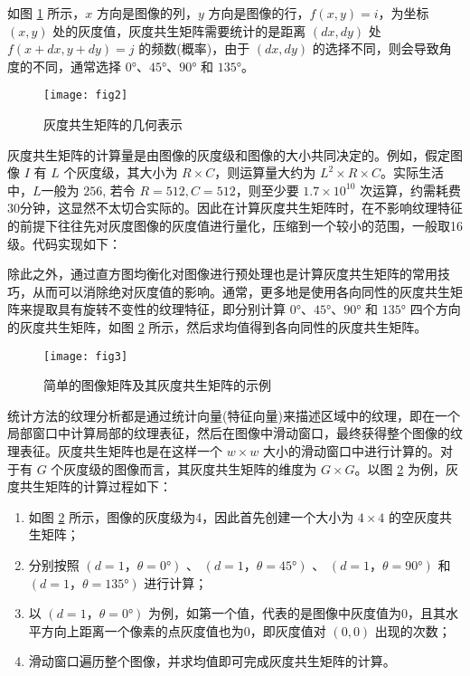 如图 \ref{fig:glcm_figure} 所示，$x$ 方向是图像的列，$y$ 方向是图像的行，$f(x, y) = i$，为坐标 $(x, y)$ 处的灰度值，灰度共生矩阵需要统计的是距离 $(dx, dy)$ 处 $f(x + dx, y + dy) = j$ 的频数(概率)，由于 $(dx, dy)$ 的选择不同，则会导致角度的不同，通常选择 $0°$、$45°$、$90°$ 和 $135°$。

\begin{figure}[!htbp]
	\centering
	\texttt{[image: fig2]}
	\caption{灰度共生矩阵的几何表示}
	\label{fig:glcm_figure}
	 \vspace{-0.5cm}
\end{figure}


灰度共生矩阵的计算量是由图像的灰度级和图像的大小共同决定的。例如，假定图像 $I$ 有 $L$ 个灰度级，其大小为 $R \times C$，则运算量大约为 $L^2 \times R \times C$。实际生活中，$L$一般为 $256$, 若令 $R=512, C=512$，则至少要 $1.7 \times 10^{10}$ 次运算，约需耗费30分钟，这显然不太切合实际的。因此在计算灰度共生矩阵时，在不影响纹理特征的前提下往往先对灰度图像的灰度值进行量化，压缩到一个较小的范围，一般取16级。代码实现如下：

\vspace{0.3cm}


除此之外，通过直方图均衡化对图像进行预处理也是计算灰度共生矩阵的常用技巧，从而可以消除绝对灰度值的影响。通常，更多地是使用各向同性的灰度共生矩阵来提取具有旋转不变性的纹理特征，即分别计算 $0°$、$45°$、$90°$ 和 $135°$ 四个方向的灰度共生矩阵，如图 \ref{fig:glcm_sample} 所示，然后求均值得到各向同性的灰度共生矩阵。

\begin{figure}[!htbp]
	\centering
	\texttt{[image: fig3]}
	\caption{简单的图像矩阵及其灰度共生矩阵的示例}
	\label{fig:glcm_sample}
\end{figure}

统计方法的纹理分析都是通过统计向量(特征向量)来描述区域中的纹理，即在一个局部窗口中计算局部的纹理表征，然后在图像中滑动窗口，最终获得整个图像的纹理表征。灰度共生矩阵也是在这样一个 $w \times w$ 大小的滑动窗口中进行计算的。对于有 $G$ 个灰度级的图像而言，其灰度共生矩阵的维度为 $G \times G$。以图 \ref{fig:glcm_sample} 为例，灰度共生矩阵的计算过程如下：

\begin{enumerate}
	\item 如图 \ref{fig:glcm_sample} 所示，图像的灰度级为4，因此首先创建一个大小为 $4 \times 4$ 的空灰度共生矩阵；
	\item 分别按照 $(d = 1，θ = 0°)$ 、 $(d = 1，θ = 45°)$ 、 $(d = 1，θ = 90°)$ 和 $(d = 1，θ = 135°)$ 进行计算；
	\item 以 $(d = 1，θ = 0°)$ 为例，如第一个值，代表的是图像中灰度值为0，且其水平方向上距离一个像素的点灰度值也为0，即灰度值对 $(0, 0)$ 出现的次数；
	\item 滑动窗口遍历整个图像，并求均值即可完成灰度共生矩阵的计算。
\end{enumerate}

